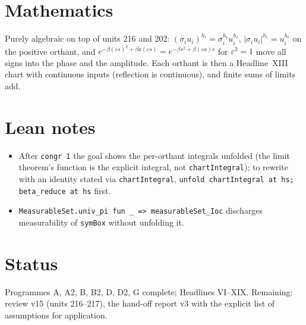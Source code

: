 \documentclass[11pt]{article}
\begin{document}
\section{Mathematics}
Purely algebraic on top of units 216 and 202: $(\sigma_iu_i)^{h_i}=\sigma_i^{h_i}u_i^{h_i}$,
$|\sigma_iu_i|^{h_i}=u_i^{h_i}$ on the positive orthant, and $e^{-\beta(\varepsilon s)^2+\beta a(\varepsilon s)}
=e^{-\beta s^2+\beta(\varepsilon a)s}$ for $\varepsilon^2=1$ move all signs into the phase and the
amplitude. Each orthant is then a Headline~XIII chart with continuous inputs (reflection is
continuous), and finite sums of limits add.

\section{Lean notes}
\begin{itemize}
\item After \texttt{congr 1} the goal shows the per-orthant integrals unfolded (the limit theorem's
  function is the explicit integral, not \texttt{chartIntegral}); to rewrite with an identity stated
  via \texttt{chartIntegral}, \texttt{unfold chartIntegral at hs; beta\_reduce at hs} first.
\item \texttt{MeasurableSet.univ\_pi fun \_ => measurableSet\_Ioc} discharges measurability of
  \texttt{symBox} without unfolding it.
\end{itemize}

\section{Status}
Programmes A, A2, B, B2, D, D2, G complete; Headlines VI--XIX. Remaining: review v15 (units
216--217), the hand-off report v3 with the explicit list of assumptions for application.
\end{document}
